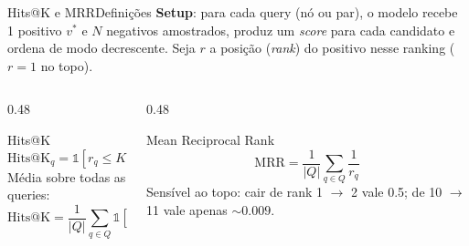 \documentclass[aspectratio=169,xcolor=dvipsnames]{beamer}
\begin{document}
  \begin{frame}{Hits@K e MRR}{Definições}
    \textbf{Setup}: para cada query (nó ou par), o modelo recebe 1 positivo
    $v^{*}$ e $N$ negativos amostrados, produz um \textit{score} para cada
    candidato e ordena de modo decrescente. Seja $r$ a posição (\textit{rank})
    do positivo nesse ranking ($r=1$ no topo).

    \vspace{0.5em}
    \begin{columns}[T]
      \begin{column}{0.48\textwidth}
        \begin{block}{Hits@K}
          \[
            \text{Hits@K}_q = \mathbb{1}[r_q \le K]
          \]
          Média sobre todas as queries:
          \[
            \text{Hits@K} = \frac{1}{|Q|}\sum_{q \in Q} \mathbb{1}[r_q \le K]
          \]
        \end{block}
      \end{column}
      \begin{column}{0.48\textwidth}
        \begin{block}{Mean Reciprocal Rank}
          \[
            \text{MRR} = \frac{1}{|Q|}\sum_{q \in Q} \frac{1}{r_q}
          \]
          Sensível ao topo: cair de rank 1 $\to$ 2 vale 0.5; de 10 $\to$ 11
          vale apenas $\sim 0.009$.
        \end{block}
      \end{column}
    \end{columns}
  \end{frame}
\end{document}
